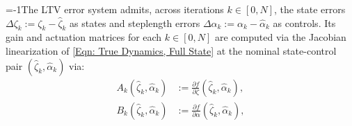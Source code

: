 \documentclass[letterpaper, 10 pt, conference]{ieeeconf}
\newcommand{\?}{\stackrel{?}{=}}
\newcommand{\param}{\theta}
\newcommand{\var}{\xi}
\newcommand{\varNominal}{\hat\var}
\newcommand{\paramNominal}{\hat\param}
\newcommand{\ratePGDNominal}{\hat\ratePGD}
\newcommand{\varError}{\Delta\var}
\newcommand{\paramError}{\Delta\param}
\newcommand{\ratePGDError}{\Delta\ratePGD}
\newcommand{\ratePGD}{\alpha}
\newcommand{\dynamicsPGD}{f_{\text{PGD}}}
\newcommand{\jacobianState}{A}
\newcommand{\jacobianControl}{B}
\newcommand{\iterationHorizon}{N}
\newcommand{\state}{\zeta}
\newcommand{\stateNominal}{\hat\state}
\newcommand{\stateNominalStacked}{\hat{\boldsymbol{\state}}}
\newcommand{\stateError}{\Delta\state}
\newcommand{\dynamicsFullState}{f}
\newcommand{\antoine}[1]{{\textcolor[rgb]{1,0,0}{\textsf{[Antoine: {#1}]}}}}
\begin{document}
\looseness=-1The LTV error system admits, across iterations $k \in [0, \iterationHorizon]$, the state errors 
$\stateError_k := \state_k - \stateNominal_k$
as states and steplength errors $\ratePGDError_k := \ratePGD_k - \ratePGDNominal_k$ 
as controls. 
Its gain and actuation matrices for each $k \in [0, \iterationHorizon]$ are computed
via the Jacobian linearization of \eqref{Eqn: True Dynamics, Full State} at the nominal state-control 
pair $(\stateNominal_k, \ratePGDNominal_k)$
via: 
{
\setlength{\abovedisplayskip}{3.5pt}
\setlength{\belowdisplayskip}{3.5pt}
\begin{subequations}
\label{Eqn: Jacobian Matrices}
\begin{align}
    \label{Eqn: Jacobian Matrix, State}
    \jacobianState_k(\stateNominal_k, \ratePGDNominal_k) &:= \textstyle\frac{\partial \dynamicsFullState}{\partial \state}(\stateNominal_k, \ratePGDNominal_k), \\
    \label{Eqn: Jacobian Matrix, Control}
    \jacobianControl_k(\stateNominal_k, \ratePGDNominal_k) &:= \textstyle\frac{\partial \dynamicsFullState}{\partial \ratePGD}(\stateNominal_k, \ratePGDNominal_k),
\end{align}
\end{subequations}
}
\end{document}
